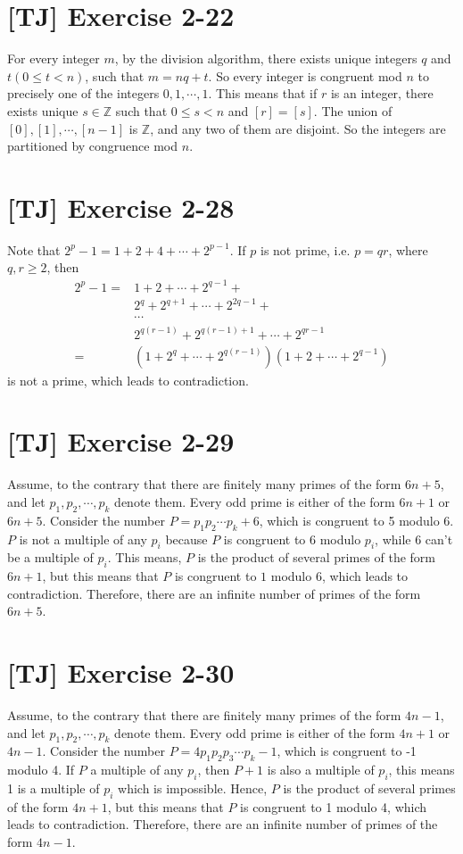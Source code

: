 \documentclass[a4paper,11pt,twocolumn]{article}
\begin{document}
  \section{[TJ] Exercise 2-22}
  For every integer $m$, by the division algorithm, there exists unique integers $q$ and $t (0 \leq t < n)$, such that $m = nq + t$. So every integer is congruent mod $n$ to precisely one of the integers $0, 1, \cdots, 1$. This means that if $r$ is an integer, there exists unique $s \in \mathbb{Z}$ such that $0 \leq s < n$ and $[r] = [s]$. The union of $[0], [1], \cdots, [n-1]$ is $\mathbb{Z}$, and any two of them are disjoint. So the integers are partitioned by congruence mod $n$.

  \section{[TJ] Exercise 2-28}
  Note that $2^p - 1 = 1 + 2 + 4 + \cdots + 2^{p-1}$. If $p$ is not prime, i.e. $p = qr$, where $q, r \geq 2$, then
  \begin{align*}
    2^p - 1 =& 1 + 2 + \cdots + 2^{q-1} + \\
             & 2^q + 2^{q+1} + \cdots + 2^{2q-1} + \\
             & \cdots \\
             & 2^{q(r-1)} + 2^{q(r-1)+1} + \cdots + 2^{qr-1} \\
            =& (1 + 2^q + \cdots + 2^{q(r-1)}) (1 + 2 + \cdots + 2^{q-1})
  \end{align*}
  is not a prime, which leads to contradiction.

  \section{[TJ] Exercise 2-29}
  Assume, to the contrary that there are finitely many primes of the form $6n+5$, and let $p_1, p_2, \cdots, p_k$ denote them. Every odd prime is either of the form $6n+1$ or $6n+5$. Consider the number $P = p_1p_2 \cdots p_k + 6$, which is congruent to 5 modulo 6. $P$ is not a multiple of any $p_i$ because $P$ is congruent to $6$ modulo $p_i$, while $6$ can't be a multiple of $p_i$. This means, $P$ is the product of several primes of the form $6n+1$, but this means that $P$ is congruent to $1$ modulo 6, which leads to contradiction. Therefore, there are an infinite number of primes of the form $6n+5$.

  \section{[TJ] Exercise 2-30}
  Assume, to the contrary that there are finitely many primes of the form $4n-1$, and let $p_1, p_2, \cdots, p_k$ denote them. Every odd prime is either of the form $4n+1$ or $4n-1$. Consider the number $P = 4p_1p_2p_3 \cdots p_k - 1$, which is congruent to -1 modulo 4. If $P$ a multiple of any $p_i$, then $P + 1$ is also a multiple of $p_i$, this means 1 is a multiple of $p_i$ which is impossible. Hence, $P$ is the product of several primes of the form $4n+1$, but this means that $P$ is congruent to 1 modulo 4, which leads to contradiction. Therefore, there are an infinite number of primes of the form $4n-1$.
\end{document}
